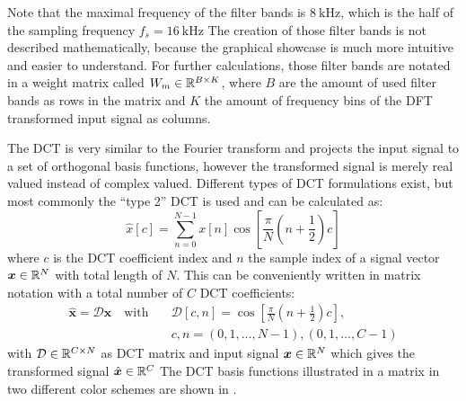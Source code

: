 \FloatBarrier
\noindent
Note that the maximal frequency of the filter bands is $\SI{8}{\kilo\hertz}$, which is the half of the sampling frequency $f_s = \SI{16}{\kilo\hertz}$
The creation of those filter bands is not described mathematically, because the graphical showcase is much more intuitive and easier to understand.
For further calculations, those filter bands are notated in a weight matrix called $W_m \in \mathbb{R}^{B \times K}$, where $B$ are the amount of used filter bands as rows in the matrix and $K$ the amount of frequency bins of the DFT transformed input signal as columns.

The DCT is very similar to the Fourier transform and projects the input signal to a set of orthogonal basis functions, however the transformed signal is merely real valued instead of complex valued.
Different types of DCT formulations exist, but most commonly the \enquote{type 2} DCT is used and can be calculated as:
\begin{equation}\label{eq:signal_mfcc_dct}
  \hat{x}[c] = \sum_{n=0}^{N-1} x[n] \cos{\left[ \frac{\pi}{N} \left( n + \frac{1}{2} \right) c \right]}
\end{equation}
where $c$ is the DCT coefficient index and $n$ the sample index of a signal vector $\bm{x} \in \mathbb{R}^N$ with total length of $N$.
This can be conveniently written in matrix notation with a total number of $C$ DCT coefficients:
\begin{equation}\label{eq:signal_mfcc_dct_matrix}
  \begin{aligned}
    \hat{\bm{x}} = \mathcal{D} \bm{x} \quad \mathrm{with} 
    \quad &\mathcal{D}[c, n] = \cos{\left[ \frac{\pi}{N} \left( n + \frac{1}{2} \right) c  \right]},\\
    &c, n = (0, 1, \dots, N - 1), (0, 1, \dots, C - 1) 
  \end{aligned}
\end{equation}
with $\mathcal{D} \in \mathbb{R}^{C \times N}$ as DCT matrix and input signal $\bm{x} \in \mathbb{R}^N$ which gives the transformed signal $\hat{\bm{x}} \in \mathbb{R}^C$
The DCT basis functions illustrated in a matrix in two different color schemes are shown in .

